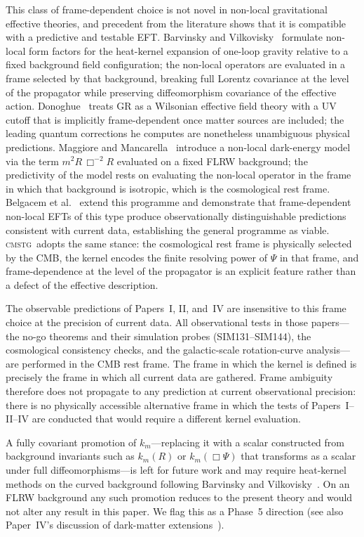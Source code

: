 \documentclass[12pt,a4paper]{article}
\newcommand{\CMSTG}{\textsc{cmstg}}
\newcommand{\km}{{k_m}}
\begin{document}
This class of frame-dependent choice is not novel in non-local gravitational
effective theories, and precedent from the literature shows that it is
compatible with a predictive and testable EFT.
Barvinsky and Vilkovisky~\cite{Barvinsky1985} formulate non-local form factors
for the heat-kernel expansion of one-loop gravity relative to a fixed background
field configuration; the non-local operators are evaluated in a frame selected
by that background, breaking full Lorentz covariance at the level of the
propagator while preserving diffeomorphism covariance of the effective action.
Donoghue~\cite{Donoghue1994} treats GR as a Wilsonian effective field theory
with a UV cutoff that is implicitly frame-dependent once matter sources are
included; the leading quantum corrections he computes are nonetheless
unambiguous physical predictions.
Maggiore and Mancarella~\cite{MaggioreMC2014} introduce a non-local dark-energy
model via the term $m^2 R\,\Box^{-2}R$ evaluated on a fixed FLRW background;
the predictivity of the model rests on evaluating the non-local operator in
the frame in which that background is isotropic, which is the cosmological rest
frame.
Belgacem et al.~\cite{Belgacem2018} extend this programme and demonstrate that
frame-dependent non-local EFTs of this type produce observationally distinguishable
predictions consistent with current data, establishing the general programme
as viable.
\CMSTG\ adopts the same stance: the cosmological rest frame is physically
selected by the CMB, the kernel encodes the finite resolving power of $\Psi$
in that frame, and frame-dependence at the level of the propagator is an
explicit feature rather than a defect of the effective description.

The observable predictions of Papers~I, II, and~IV are insensitive to this
frame choice at the precision of current data. All observational tests in
those papers---the no-go theorems and their simulation probes (SIM131--SIM144),
the cosmological consistency checks, and the galactic-scale rotation-curve
analysis---are performed in the CMB rest frame. The frame in which the kernel
is defined is precisely the frame in which all current data are gathered.
Frame ambiguity therefore does not propagate to any prediction at current
observational precision: there is no physically accessible alternative frame
in which the tests of Papers~I--II--IV are conducted that would require a
different kernel evaluation.

A fully covariant promotion of $\km$---replacing it with a scalar constructed
from background invariants such as $\km(R)$ or $\km(\Box\Psi)$ that transforms
as a scalar under full diffeomorphisms---is left for future work and may require
heat-kernel methods on the curved background following
Barvinsky and Vilkovisky~\cite{Barvinsky1985}. On an FLRW background any such
promotion reduces to the present theory and would not alter any result in this
paper. We flag this as a Phase~5 direction (see also Paper~IV's discussion of
dark-matter extensions~\cite{WilsonPaperIV}).
\end{document}

